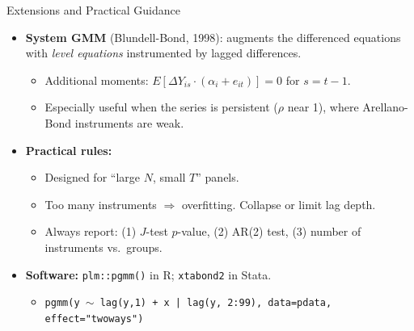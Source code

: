 \documentclass[aspectratio=169, handout, t]{beamer}
\numberwithin{equation}{section}
\begin{document}
\begin{frame}{Extensions and Practical Guidance}
\begin{itemize}
\item \textbf{System GMM} (Blundell-Bond, 1998): augments the differenced equations with \emph{level equations} instrumented by lagged differences.
\begin{itemize}
\item Additional moments: $E[\Delta Y_{is}\cdot(\alpha_i+e_{it})]=0$ for $s=t-1$.
\item Especially useful when the series is persistent ($\rho$ near 1), where Arellano-Bond instruments are weak.
\end{itemize}\pause
\item \textbf{Practical rules:}
\begin{itemize}
\item Designed for ``large $N$, small $T$'' panels.
\item Too many instruments $\Rightarrow$ overfitting. Collapse or limit lag depth.
\item Always report: (1) $J$-test $p$-value, (2) AR(2) test, (3) number of instruments vs.\ groups.
\end{itemize}\pause
\item \textbf{Software:} \texttt{plm::pgmm()} in R; \texttt{xtabond2} in Stata.
\begin{itemize}
\item \texttt{pgmm(y $\sim$ lag(y,1) + x | lag(y, 2:99), data=pdata, effect="twoways")}
\end{itemize}
\end{itemize}
\end{frame}
\end{document}

